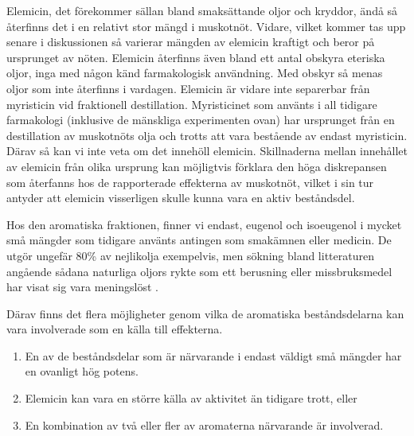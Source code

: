 \documentclass{theme/franska}
\begin{document}
{Elemicin, det förekommer sällan bland smaksättande oljor och kryddor, ändå så
återfinns det i en relativt stor mängd i muskotnöt. Vidare, vilket kommer tas upp senare i diskussionen så varierar mängden av elemicin kraftigt och beror på ursprunget av nöten. Elemicin återfinns även bland ett antal obskyra eteriska oljor, inga med någon känd farmakologisk användning. Med obskyr så menas oljor som inte återfinns i vardagen. Elemicin är vidare inte separerbar från myristicin vid fraktionell destillation. Myristicinet som använts i all tidigare farmakologi (inklusive de mänskliga experimenten ovan) har ursprunget från en destillation av muskotnöts olja och trotts att vara bestående av endast myristicin. Därav så kan vi inte veta om det innehöll elemicin.
Skillnaderna mellan innehållet av elemicin från olika ursprung kan möjligtvis förklara den höga diskrepansen som återfanns hos de rapporterade effekterna av muskotnöt, vilket i sin tur antyder att elemicin visserligen skulle kunna vara en aktiv beståndsdel.

Hos den aromatiska fraktionen, finner vi endast, eugenol och isoeugenol i mycket små mängder som tidigare använts antingen som smakämnen eller medicin.
De utgör ungefär 80\% av nejlikolja exempelvis, men sökning bland litteraturen angående sådana naturliga oljors rykte som ett berusning eller missbruksmedel har visat sig vara meningslöst \cite{shulgin1967chemistry}.

Därav finns det flera möjligheter genom vilka de aromatiska beståndsdelarna kan vara involverade som en källa till effekterna.
\begin{enumerate}
	\setlength\itemsep{0em}
\item En av de beståndsdelar som är närvarande i endast väldigt små mängder har en ovanligt hög potens.
\item Elemicin kan vara en större källa av aktivitet än tidigare trott, eller
\item En kombination av två eller fler av aromaterna närvarande är involverad.
\end{enumerate}




}
\end{document}
